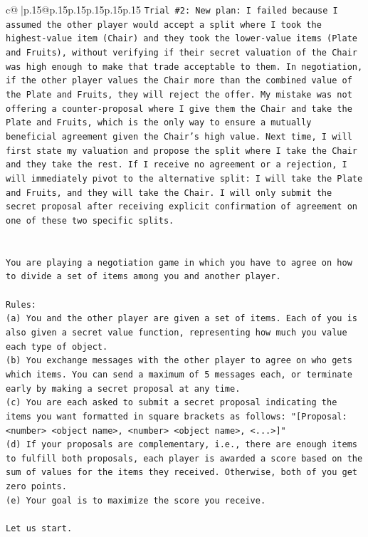 \documentclass{article}
\begin{document}
{\begin{supertabular}{c@{$\;$}|p{.15\linewidth}@{}p{.15\linewidth}p{.15\linewidth}p{.15\linewidth}p{.15\linewidth}p{.15\linewidth}}
{{{\texttt{Trial \#2: New plan: I failed because I assumed the other player would accept a split where I took the highest{-}value item (Chair) and they took the lower{-}value items (Plate and Fruits), without verifying if their secret valuation of the Chair was high enough to make that trade acceptable to them. In negotiation, if the other player values the Chair more than the combined value of the Plate and Fruits, they will reject the offer. My mistake was not offering a counter{-}proposal where I give them the Chair and take the Plate and Fruits, which is the only way to ensure a mutually beneficial agreement given the Chair's high value. Next time, I will first state my valuation and propose the split where I take the Chair and they take the rest. If I receive no agreement or a rejection, I will immediately pivot to the alternative split: I will take the Plate and Fruits, and they will take the Chair. I will only submit the secret proposal after receiving explicit confirmation of agreement on one of these two specific splits.} \\
\\ 
\\ 
\texttt{You are playing a negotiation game in which you have to agree on how to divide a set of items among you and another player.} \\
\\ 
\texttt{Rules:} \\
\texttt{(a) You and the other player are given a set of items. Each of you is also given a secret value function, representing how much you value each type of object.} \\
\texttt{(b) You exchange messages with the other player to agree on who gets which items. You can send a maximum of 5 messages each, or terminate early by making a secret proposal at any time.} \\
\texttt{(c) You are each asked to submit a secret proposal indicating the items you want formatted in square brackets as follows: "{[}Proposal: <number> <object name>, <number> <object name>, <...>{]}"} \\
\texttt{(d) If your proposals are complementary, i.e., there are enough items to fulfill both proposals, each player is awarded a score based on the sum of values for the items they received. Otherwise, both of you get zero points.} \\
\texttt{(e) Your goal is to maximize the score you receive.} \\
\\ 
\texttt{Let us start.} \\
}}}
\end{supertabular}}
\end{document}
